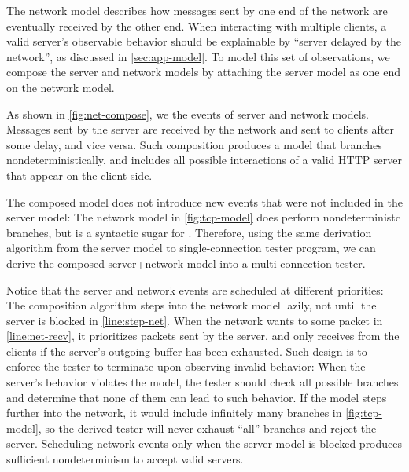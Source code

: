 The network model describes how messages sent by one end of the network are
eventually received by the other end.  When interacting with multiple clients, a
valid server's observable behavior should be explainable by ``server delayed by the
network'', as discussed in \autoref{sec:app-model}.  To model this set of
observations, we compose the server and network models by attaching the server
model as one end on the network model.

As shown in \autoref{fig:net-compose}, we  the events of server and
network
models.  Messages sent by the server are received by the network and sent to clients after some
delay, and vice versa.  Such composition produces a model that branches
nondeterministically, and includes all possible interactions of a valid HTTP
server that appear on the client side.

The composed model does not introduce new events that were not included in the server model:
The network model in \autoref{fig:tcp-model} does perform nondeterministc 
branches, but  is a syntactic sugar for .
Therefore, using the same derivation algorithm from the server model to
single-connection tester program, we can derive the composed server+network model into a
multi-connection tester.

Notice that the server and network events are scheduled at different priorities: The
composition algorithm steps into the network model lazily, not until the
server is blocked in \autoref{line:step-net}.  When the network wants to
 some packet in \autoref{line:net-recv}, it prioritizes packets sent
by the server, and only receives from the clients if the server's
outgoing buffer has been exhausted.  Such design is to enforce the tester to
terminate upon observing invalid behavior: When the server's behavior violates
the model, the tester should check all possible branches and determine that none
of them can lead to such behavior.  If the model steps further into the network, it would
include infinitely many  branches in \autoref{fig:tcp-model}, so the
derived tester will never exhaust ``all'' branches and reject the server.
Scheduling network events only when the server model is blocked produces sufficient nondeterminism to
accept valid servers.

